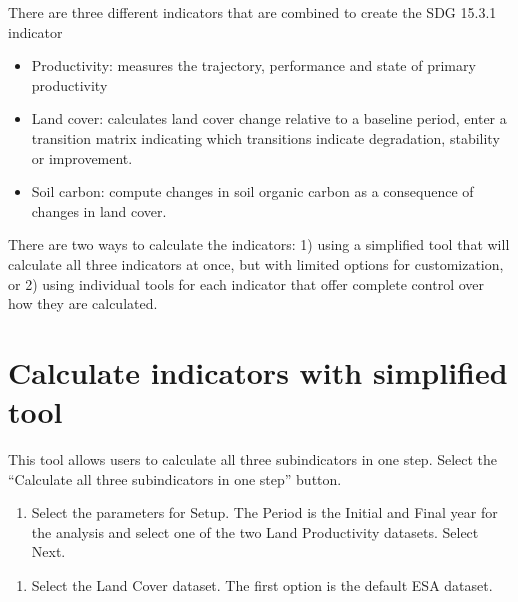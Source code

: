 \documentclass[letterpaper,10pt,english]{sphinxmanual}
\begin{document}
\sphinxAtStartPar
There are three different indicators that are combined to create the SDG 15.3.1
indicator
\begin{itemize}
\item {} 
\sphinxAtStartPar
Productivity: measures the trajectory, performance and state of primary
productivity

\item {} 
\sphinxAtStartPar
Land cover: calculates land cover change relative to a baseline period, enter
a transition matrix indicating which transitions indicate degradation,
stability or improvement.

\item {} 
\sphinxAtStartPar
Soil carbon: compute changes in soil organic carbon as a consequence of
changes in land cover.

\end{itemize}

\sphinxAtStartPar
There are two ways to calculate the indicators: 1) using a simplified tool that
will calculate all three indicators at once, but with limited options for
customization, or 2) using individual tools for each indicator that offer
complete control over how they are calculated.


\section{Calculate indicators with simplified tool}
\label{\detokenize{Qgis_Plugin/Calculate_sdg15:calculate-indicators-with-simplified-tool}}
\sphinxAtStartPar
This tool allows users to calculate all three sub\sphinxhyphen{}indicators in one step.
Select the “Calculate all three sub\sphinxhyphen{}indicators in one step” button.
\begin{enumerate}
%
\item {} 
\sphinxAtStartPar
Select the parameters for Setup. The Period is the Initial and Final year
for the analysis and select one of the two Land Productivity datasets.
Select Next.

\end{enumerate}

\begin{enumerate}
%
\setcounter{enumi}{1}
\item {} 
\sphinxAtStartPar
Select the Land Cover dataset. The first option is the default ESA dataset.

\end{enumerate}
\end{document}
